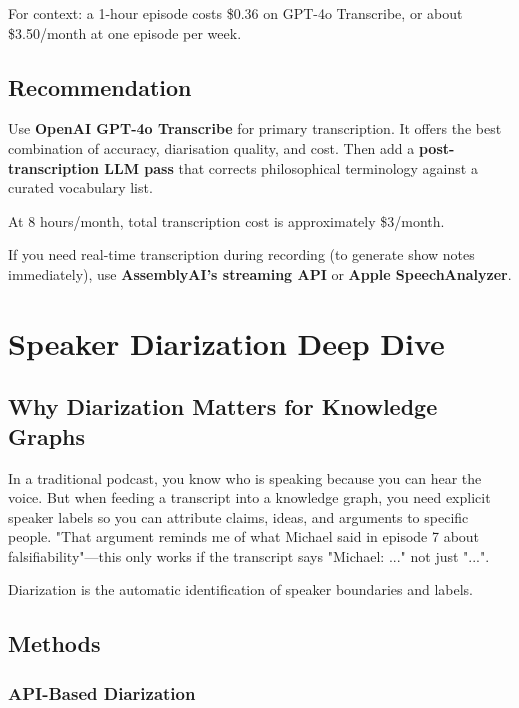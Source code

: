 \documentclass[11pt,letterpaper]{article}
\begin{document}
For context: a 1-hour episode costs \$0.36 on GPT-4o Transcribe, or about \$3.50/month at one episode per week.

\subsection{Recommendation}

Use \textbf{OpenAI GPT-4o Transcribe} for primary transcription. It offers the best combination of accuracy, diarisation quality, and cost. Then add a \textbf{post-transcription LLM pass} that corrects philosophical terminology against a curated vocabulary list.

At 8 hours/month, total transcription cost is approximately \$3/month.

If you need real-time transcription during recording (to generate show notes immediately), use \textbf{AssemblyAI's streaming API} or \textbf{Apple SpeechAnalyzer}.

\vspace{12pt}

\section{Speaker Diarization Deep Dive}

\subsection{Why Diarization Matters for Knowledge Graphs}

In a traditional podcast, you know who is speaking because you can hear the voice. But when feeding a transcript into a knowledge graph, you need explicit speaker labels so you can attribute claims, ideas, and arguments to specific people. "That argument reminds me of what Michael said in episode 7 about falsifiability"—this only works if the transcript says "Michael: ..." not just "...".

Diarization is the automatic identification of speaker boundaries and labels.

\subsection{Methods}

\subsubsection{API-Based Diarization}
\end{document}
